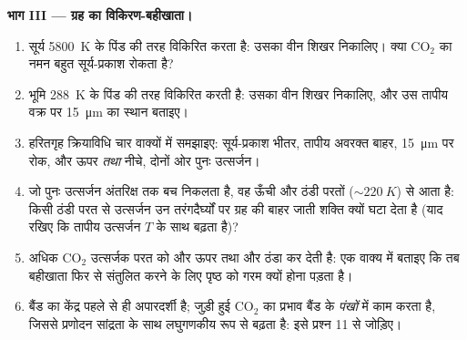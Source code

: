 \begin{problem}
\medskip\noindent\textbf{भाग III --- ग्रह का विकिरण-बहीखाता।}
\begin{enumerate}[resume]
  \item सूर्य \qty{5800}{K} के पिंड की तरह विकिरित करता है: उसका
        वीन शिखर निकालिए। क्या CO$_2$ का नमन बहुत सूर्य-प्रकाश रोकता है?
  \item भूमि \qty{288}{K} के पिंड की तरह विकिरित करती है: उसका
        वीन शिखर निकालिए, और उस तापीय वक्र पर \qty{15}{\micro m}
        का स्थान बताइए।
  \item हरितगृह क्रियाविधि चार वाक्यों में समझाइए:
        सूर्य-प्रकाश भीतर, तापीय अवरक्त बाहर, \qty{15}{\micro m} पर
        रोक, और ऊपर \emph{तथा} नीचे, दोनों ओर पुनः उत्सर्जन।
  \item जो पुनः उत्सर्जन अंतरिक्ष तक बच निकलता है, वह ऊँची और ठंडी
        परतों ($\sim\qty{220}{K}$) से आता है: किसी ठंडी परत से
        उत्सर्जन उन तरंगदैर्घ्यों पर ग्रह की बाहर जाती शक्ति क्यों
        घटा देता है (याद रखिए कि तापीय उत्सर्जन $T$ के साथ बढ़ता है)?
  \item अधिक CO$_2$ उत्सर्जक परत को और ऊपर तथा और ठंडा कर देती है:
        एक वाक्य में बताइए कि तब बहीखाता फिर से संतुलित करने के लिए
        पृष्ठ को गरम क्यों होना पड़ता है।
  \item बैंड का केंद्र पहले से ही अपारदर्शी है; जुड़ी हुई CO$_2$ का
        प्रभाव बैंड के \emph{पंखों} में काम करता है, जिससे प्रणोदन
        सांद्रता के साथ लघुगणकीय रूप से बढ़ता है: इसे प्रश्न 11 से
        जोड़िए।
\end{enumerate}


\end{problem}
